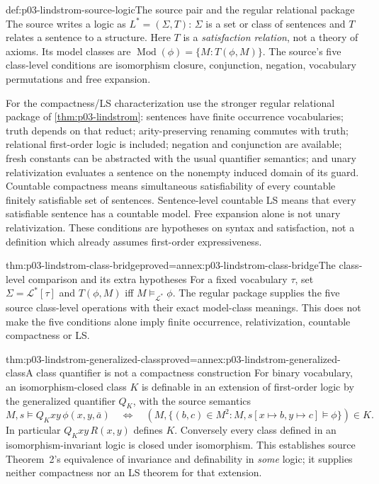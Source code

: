 \begin{hbdefinition}{def:p03-lindstrom-source-logic}{The source pair and the regular relational package}
The source writes a logic as \(L^*=(\Sigma,T)\): \(\Sigma\) is a set
or class of sentences and \(T\) relates a sentence to a structure.
Here \(T\) is a \emph{satisfaction relation}, not a theory of axioms.
Its model classes are \(\operatorname{Mod}(\phi)=\{M:T(\phi,M)\}\).
The source's five class-level conditions are isomorphism closure,
conjunction, negation, vocabulary permutations and free expansion.

For the compactness/LS characterization use the stronger regular relational
package of \cref{thm:p03-lindstrom}: sentences have finite occurrence
vocabularies; truth depends on that reduct; arity-preserving renaming
commutes with truth; relational first-order logic is included; negation and
conjunction are available; fresh constants can be abstracted with the usual
quantifier semantics; and unary relativization evaluates a sentence on the
nonempty induced domain of its guard. Countable compactness means
simultaneous satisfiability of every countable finitely satisfiable set of
sentences. Sentence-level countable LS means that every satisfiable sentence
has a countable model. Free expansion alone is not unary relativization.
These conditions are hypotheses on syntax and satisfaction, not a definition
which already assumes first-order expressiveness.
\end{hbdefinition}

\begin{hblemma}{thm:p03-lindstrom-class-bridge}{proved=annex:p03-lindstrom-class-bridge}{The class-level comparison and its extra hypotheses}
For a fixed vocabulary \(\tau\), set
\(\Sigma=\mathcal L^*[\tau]\) and
\(T(\phi,M)\) iff \(M\models_{\mathcal L^*}\phi\).
The regular package supplies the five source class-level operations with
their exact model-class meanings. This does not make the five conditions
alone imply finite occurrence, relativization, countable compactness or LS.
\end{hblemma}

\begin{hbtheorem}{thm:p03-lindstrom-generalized-class}{proved=annex:p03-lindstrom-generalized-class}{A class quantifier is not a compactness construction}
For binary vocabulary, an isomorphism-closed class \(K\) is definable
in an extension of first-order logic by the generalized quantifier
\(Q_K\), with the source semantics
\[
 M,s\models Q_Kxy\,\phi(x,y,\bar a)
 \quad\Longleftrightarrow\quad
 (M,\{(b,c)\in M^2:M,s[x\mapsto b,y\mapsto c]\models\phi\})\in K.
\]
In particular \(Q_Kxy\,R(x,y)\) defines \(K\).
Conversely every class defined in an isomorphism-invariant logic is closed
under isomorphism. This establishes source Theorem~2's equivalence of
invariance and definability in \emph{some} logic; it supplies neither
compactness nor an LS theorem for that extension.
\end{hbtheorem}


